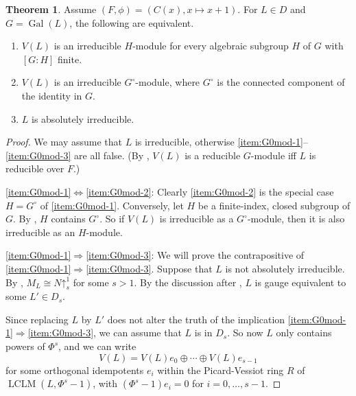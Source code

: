 \documentclass[11pt,reqno]{amsart}
\theoremstyle{definition}
\newtheorem{theorem}{Theorem}[section]
\DeclareMathOperator{\LCLM}{LCLM}
\DeclareMathOperator{\Gal}{Gal}
\newcommand{\pua}{\mathord{\uparrow}}
\begin{document}
\begin{theorem}\label{G^0-mod} 
    Assume $(F,\phi)=(C(x),x\mapsto x+1)$.
    For $L \in D$ and $G=\Gal(L)$, the following are equivalent.
    \begin{enumerate}
        \item\label{item:G0mod-1} $V(L)$ is an irreducible $H$-module for every algebraic subgroup $H$ of $G$ with $[G:H]$ finite.
        \item\label{item:G0mod-2} $V(L)$ is an irreducible $G^\circ$-module, where $G^\circ$ is the connected component of the identity in $G$.
        \item\label{item:G0mod-3} $L$ is absolutely irreducible. 
    \end{enumerate}
\end{theorem}


\begin{proof}
    We may assume that $L$ is irreducible, otherwise \eqref{item:G0mod-1}--\eqref{item:G0mod-3} are all false.
    (By , 
    $V(L)$ is a reducible $G$-module iff
    $L$ is reducible over $F$.)
    
    \eqref{item:G0mod-1}$\Leftrightarrow$\eqref{item:G0mod-2}:
    Clearly \eqref{item:G0mod-2} is the special case $H=G^{\circ}$ of \eqref{item:G0mod-1}. 
    Conversely, let $H$ be a finite-index, closed subgroup of $G$. By \cite[Proposition 2.2.1]{springer1998linear}, $H$ contains $G^\circ$.
    So if $V(L)$ is irreducible as a $G^{\circ}$-module, then it is also irreducible as an $H$-module.
    
    \eqref{item:G0mod-1}$\Rightarrow$\eqref{item:G0mod-3}: 
    We will prove the contrapositive of \eqref{item:G0mod-1}$\Rightarrow$\eqref{item:G0mod-3}. 
    Suppose that $L$ is not absolutely irreducible. 
    By , $M_L\cong N\pua^1_s$ for some $s>1$. 
    By the discussion after , $L$ is gauge equivalent to some $L'\in D_s$.

    Since replacing $L$ by $L'$ does not alter the truth of the implication \eqref{item:G0mod-1}$\Rightarrow$\eqref{item:G0mod-3}, we can assume that $L$ is in $D_s$.
    So now $L$ only contains powers of $\Phi^s$, and we can write
    \[ V(L) = V(L)e_0 \oplus \cdots \oplus V(L)e_{s-1}\]
    for some orthogonal idempotents $e_i$ within the Picard-Vessiot ring $R$ of $\LCLM(L, \Phi^s - 1)$, with $(\Phi^s-1)e_i=0$ for $i=0,\dots,s-1$.


\end{proof}
\end{document}
